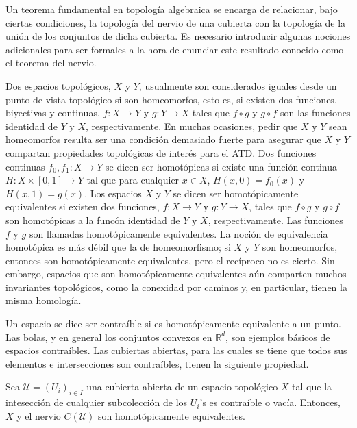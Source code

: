 Un teorema fundamental en topolog\'ia algebraica se encarga de relacionar, bajo ciertas condiciones, la
topolog\'ia del nervio de una cubierta con la topolog\'ia de la uni\'on de los conjuntos
de dicha cubierta. Es necesario introducir algunas nociones adicionales para ser
formales a la hora de enunciar este
resultado conocido como el teorema del nervio.

Dos espacios topol\'ogicos, $X$ y $Y$, usualmente son considerados iguales desde un punto de vista
topol\'ogico si son homeomorfos, esto es, si existen dos funciones, biyectivas y continuas,
$f:X\rightarrow Y$ y $g:Y\rightarrow X$ tales que $f\circ g$ y $g\circ f$ son las funciones
identidad de $Y$ y $X$, respectivamente. En muchas ocasiones, pedir que $X$ y $Y$ sean
homeomorfos resulta ser una condici\'on demasiado fuerte para asegurar que $X$ y $Y$
compartan propiedades topol\'ogicas de inter\'es para el ATD.
Dos funciones continuas $f_{0}, f_{1}:X\rightarrow Y$ se dicen ser homot\'opicas
si existe una funci\'on continua $H:X\times\left[0, 1\right]\rightarrow Y$ tal que para
cualquier $x\in X$, $H\left(x, 0\right) = f_{0}\left(x\right)$ y $H\left(x, 1\right) = g\left(x\right)$.
Los espacios $X$ y $Y$ se dicen ser homot\'opicamente equivalentes si existen
dos funciones, $f:X\rightarrow Y$ y $g:Y\rightarrow X$, tales que $f\circ g$ y $g\circ f$ son
homot\'opicas a la func\'on identidad de $Y$ y $X$, respectivamente.
Las funciones $f$ y $g$ son llamadas homot\'opicamente equivalentes. La noci\'on de
equivalencia homot\'opica es m\'as d\'ebil que la de homeomorfismo; si $X$ y $Y$ son homeomorfos, entonces
son homot\'opicamente equivalentes, pero el rec\'iproco no es cierto. Sin embargo, espacios que son
homot\'opicamente equivalentes a\'un comparten muchos invariantes topol\'ogicos, como la conexidad por
caminos y, en particular, tienen la misma homolog\'ia.

Un espacio se dice ser contra\'ible si es homot\'opicamente equivalente a un punto. Las bolas, y en
general los conjuntos convexos en $\mathbb{R}^{d}$, son ejemplos b\'asicos de espacios contra\'ibles.
Las cubiertas abiertas, para las cuales se tiene que todos sus elementos e intersecciones son
contra\'ibles, tienen la siguiente propiedad.

\begin{teorema}\label{teoNervio}
    Sea $\mathcal{U} = \left(U_{i}\right)_{i\in I}$ una
    cubierta abierta de un espacio topol\'ogico $X$ tal que la intesecci\'on
    de cualquier subcolecci\'on de los $U_{i}$'s es contra\'ible o vac\'ia.
    Entonces, $X$ y el nervio $C\left(\mathcal{U}\right)$ son
    homot\'opicamente equivalentes.
\end{teorema}

